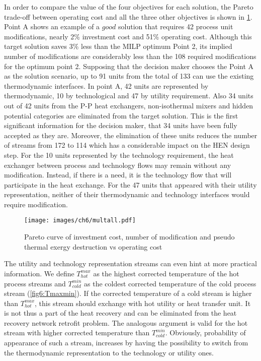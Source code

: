 In order to compare the value of the four objectives for each solution, the Pareto trade-off between operating cost and all the three other objectives is shown in \cref{fig6:multall}. Point A shows an example of a $good$ solution that requires 42 process unit modifications, nearly 2\% investment cost and 51\% operating cost. Although this target solution saves 3\% less than the MILP optimum Point 2, its implied number of modifications are considerably less than the 108 required modifications for the optimum point 2. Supposing that the decision maker chooses the Point A as the solution scenario, up to 91 units from the total of 133 can use the existing thermodynamic interfaces. In point A, 42 units are represented by thermodynamic, 10 by technological and 47 by utility requirement. Also 34 units out of 42 units from the P-P heat exchangers, non-isothermal mixers and hidden potential categories are eliminated from the target solution. This is the first significant information for the decision maker, that 34 units have been fully accepted as they are. Moreover, the elimination of these units reduces the number of streams from 172 to 114 which has a considerable impact on the HEN design step. For the 10 units represented by the technology requirement, the heat exchanger between process and technology flows may remain without any modification. Instead, if there is a need, it is the technology flow that will participate in the heat exchange. For the 47 units that appeared with their utility representation, neither of their thermodynamic and technology interfaces would require modification. 

    \begin{figure}[!ht]
    \vspace{2mm}
       \begin{center}
       \texttt{[image: images/ch6/multall.pdf]} 
       \caption{Pareto curve of investment cost, number of modification and pseudo thermal exergy destruction vs operating cost} \vspace*{-5mm}
       \label{fig6:multall}
       \end{center}
       \vspace{4mm}
       \end{figure}   

The utility and technology representation streams can even hint at more practical information. We define $T_{hot}^{max}$ as the highest corrected temperature of the hot process streams and $T_{cold}^{min}$ as the coldest corrected temperature of the cold process stream (\cref{fig6:Tmaxmin}). If the corrected temperature of a cold stream is higher than $T_{hot}^{max}$, this stream should exchange with hot utility or heat transfer unit. It is not thus a part of the heat recovery and can be eliminated from the heat recovery network retrofit problem. The analogous argument is valid for the hot stream with higher corrected temperature than $T_{cold}^{min}$. Obviously, probability of appearance of such a stream, increases by having the possibility to switch from the thermodynamic representation to the technology or utility ones. 
        
